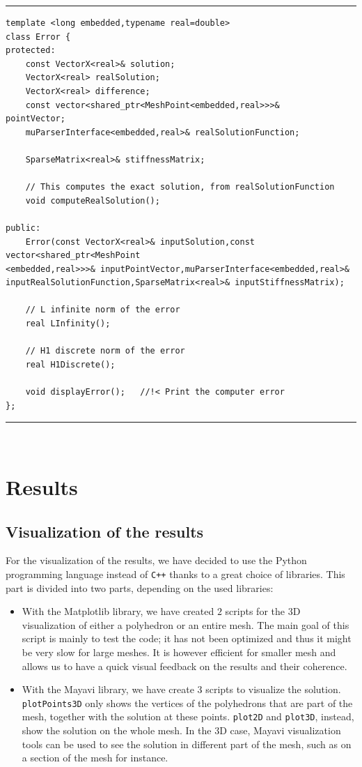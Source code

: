 \noindent\rule{16cm}{1pt}
\begin{lstlisting}[caption=File \texttt{Error.h}]
template <long embedded,typename real=double>
class Error {
protected:
    const VectorX<real>& solution;
    VectorX<real> realSolution;
    VectorX<real> difference;
    const vector<shared_ptr<MeshPoint<embedded,real>>>& 
pointVector;
    muParserInterface<embedded,real>& realSolutionFunction;
	
    SparseMatrix<real>& stiffnessMatrix;
	
    // This computes the exact solution, from realSolutionFunction
    void computeRealSolution(); 
	
public:
    Error(const VectorX<real>& inputSolution,const vector<shared_ptr<MeshPoint
<embedded,real>>>& inputPointVector,muParserInterface<embedded,real>& 
inputRealSolutionFunction,SparseMatrix<real>& inputStiffnessMatrix);

    // L infinite norm of the error
    real LInfinity();
	
    // H1 discrete norm of the error
    real H1Discrete();
	
    void displayError();   //!< Print the computer error	
};
\end{lstlisting}
\noindent\rule{16cm}{1pt}\\

\newpage
\section{Results}\label{results}

\subsection{Visualization of the results}
For the visualization of the results, we have decided to use the Python programming language instead of \verb!C++! thanks to a great choice of libraries. This part is divided into two parts, depending on the used libraries:
\begin{itemize}
\item With the Matplotlib library, we have created $2$ scripts for the $3$D visualization of either a polyhedron or an entire mesh. The main goal of this script is mainly to test the code; it has not been optimized and thus it might be very slow for large meshes. It is however efficient for smaller mesh and allows us to have a quick visual feedback on the results and their coherence. 
\item With the Mayavi library, we have create $3$ scripts to visualize the solution. \verb|plotPoints3D| only shows the vertices of the polyhedrons that are part of the mesh, together with the solution at these points. \verb|plot2D| and \verb|plot3D|, instead, show the solution on the whole mesh. In the $3$D case, Mayavi visualization tools can be used to see the solution in different part of the mesh, such as on a section of the mesh for instance. 
\end{itemize}

